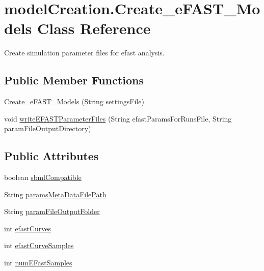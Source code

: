 \hypertarget{classmodelCreation_1_1Create__eFAST__Models}{}\section{model\+Creation.\+Create\+\_\+e\+F\+A\+S\+T\+\_\+\+Models Class Reference}
\label{classmodelCreation_1_1Create__eFAST__Models}


Create simulation parameter files for efast analysis.  


\subsection*{Public Member Functions}
\begin{DoxyCompactItemize}
\item 
\hyperlink{classmodelCreation_1_1Create__eFAST__Models_a549686f2f796ff48ba454519f84fc799}{Create\+\_\+e\+F\+A\+S\+T\+\_\+\+Models} (String settings\+File)
\item 
void \hyperlink{classmodelCreation_1_1Create__eFAST__Models_a1908be9dc257cfcbee767d2062841dc7}{write\+E\+F\+A\+S\+T\+Parameter\+Files} (String efast\+Params\+For\+Runs\+File, String param\+File\+Output\+Directory)
\end{DoxyCompactItemize}
\subsection*{Public Attributes}
\begin{DoxyCompactItemize}
\item 
boolean \hyperlink{classmodelCreation_1_1Create__eFAST__Models_aa004bf022772ece1e489a4af00c26096}{sbml\+Compatible}
\item 
String \hyperlink{classmodelCreation_1_1Create__eFAST__Models_acf43f15ebfad126fdc7ce42a33c1b39d}{params\+Meta\+Data\+File\+Path}
\item 
String \hyperlink{classmodelCreation_1_1Create__eFAST__Models_a24e594a0a8434b90625f7ec3a130a65c}{param\+File\+Output\+Folder}
\item 
int \hyperlink{classmodelCreation_1_1Create__eFAST__Models_a4a82f490d79da6b61bb0de68cac3dafe}{efast\+Curves}
\item 
int \hyperlink{classmodelCreation_1_1Create__eFAST__Models_aadc25e3a9a65b291e9b81629909da925}{efast\+Curve\+Samples}
\item 
int \hyperlink{classmodelCreation_1_1Create__eFAST__Models_a7e4d5457ed8f69db260c0328e585fe96}{num\+E\+Fast\+Samples}
\end{DoxyCompactItemize}


